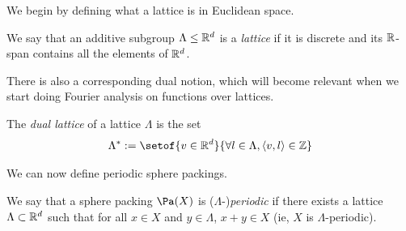 We begin by defining what a lattice is in Euclidean space.

\begin{definition}\label{IsZLattice}\leanok
  We say that an additive subgroup $\Lambda \leq \mathbb{R}^d$ is a \emph{lattice} if it is discrete and its $\mathbb{R}$-span contains all the elements of $\mathbb{R}^d$.
\end{definition}

There is also a corresponding dual notion, which will become relevant when we start doing Fourier analysis on functions over lattices.

\begin{definition}\label{def:dual-lattice}\leanok
  The \emph{dual lattice} of a lattice $\Lambda$ is the set
  \[ \Lambda^* := \setof{v \in \R^d}{\forall l \in \Lambda, \left\langle v,l \right\rangle \in \Z} \]
\end{definition}



We can now define periodic sphere packings.

\begin{definition}\label{PeriodicSpherePacking}\leanok
  We say that a sphere packing $\Pa(X)$ is ($\Lambda$-)\emph{periodic} if there exists a lattice $\Lambda \subset \mathbb{R}^d$ such that for all $x \in X$ and $y \in \Lambda$, $x + y \in X$ (ie, $X$ is $\Lambda$-periodic).
\end{definition}


